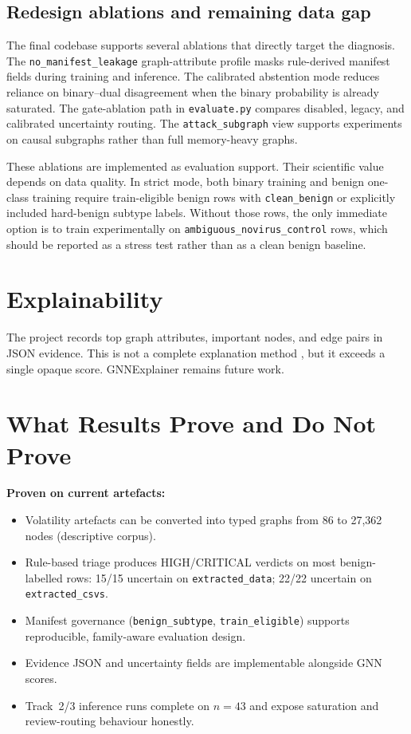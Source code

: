 \subsection{Redesign ablations and remaining data gap}

The final codebase supports several ablations that directly target the diagnosis. The \texttt{no\_manifest\_leakage} graph-attribute profile masks rule-derived manifest fields during training and inference. The calibrated abstention mode reduces reliance on binary--dual disagreement when the binary probability is already saturated. The gate-ablation path in \texttt{evaluate.py} compares disabled, legacy, and calibrated uncertainty routing. The \texttt{attack\_subgraph} view supports experiments on causal subgraphs rather than full memory-heavy graphs.

These ablations are implemented as evaluation support. Their scientific value depends on data quality. In strict mode, both binary training and benign one-class training require train-eligible benign rows with \texttt{clean\_benign} or explicitly included hard-benign subtype labels. Without those rows, the only immediate option is to train experimentally on \texttt{ambiguous\_novirus\_control} rows, which should be reported as a stress test rather than as a clean benign baseline.

\section{Explainability}

The project records top graph attributes, important nodes, and edge pairs in JSON evidence. This is not a complete explanation method \cite{doshi2017interpretable}, but it exceeds a single opaque score. GNNExplainer \cite{ying2019gnnexplainer} remains future work.

\section{What Results Prove and Do Not Prove}

\textbf{Proven on current artefacts:}
\begin{itemize}
\item Volatility artefacts can be converted into typed graphs from 86 to 27,362 nodes (descriptive corpus).
\item Rule-based triage produces HIGH/CRITICAL verdicts on most benign-labelled rows: 15/15 uncertain on \texttt{extracted\_data}; 22/22 uncertain on \texttt{extracted\_csvs}.
\item Manifest governance (\texttt{benign\_subtype}, \texttt{train\_eligible}) supports reproducible, family-aware evaluation design.
\item Evidence JSON and uncertainty fields are implementable alongside GNN scores.
\item Track~2/3 inference runs complete on $n{=}43$ and expose saturation and review-routing behaviour honestly.
\end{itemize}

